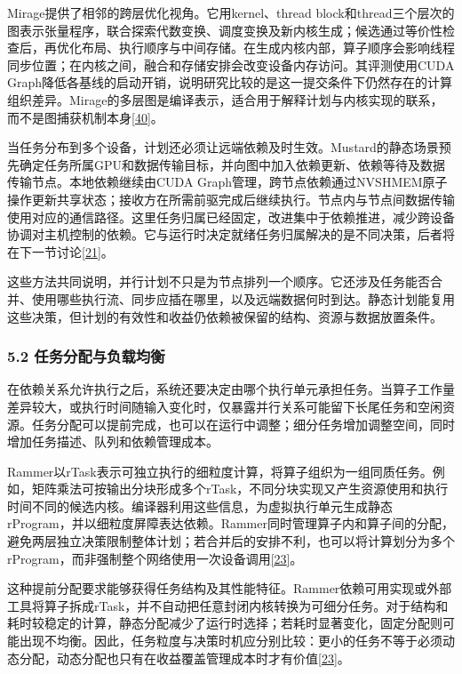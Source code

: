 \documentclass[UTF8,11pt,fontset=windows]{ctexart}
\begin{document}
Mirage提供了相邻的跨层优化视角。它用kernel、thread block和thread三个层次的图表示张量程序，联合探索代数变换、调度变换及新内核生成；候选通过等价性检查后，再优化布局、执行顺序与中间存储。在生成内核内部，算子顺序会影响线程同步位置；在内核之间，融合和存储安排会改变设备内存访问。其评测使用CUDA Graph降低各基线的启动开销，说明研究比较的是这一提交条件下仍然存在的计算组织差异。Mirage的多层图是编译表示，适合用于解释计划与内核实现的联系，而不是图捕获机制本身\protect\hyperlink{ref-40}{{[}40{]}}。

当任务分布到多个设备，计划还必须让远端依赖及时生效。Mustard的静态场景预先确定任务所属GPU和数据传输目标，并向图中加入依赖更新、依赖等待及数据传输节点。本地依赖继续由CUDA Graph管理，跨节点依赖通过NVSHMEM原子操作更新共享状态；接收方在所需前驱完成后继续执行。节点内与节点间数据传输使用对应的通信路径。这里任务归属已经固定，改进集中于依赖推进，减少跨设备协调对主机控制的依赖。它与运行时决定就绪任务归属解决的是不同决策，后者将在下一节讨论\protect\hyperlink{ref-21}{{[}21{]}}。

这些方法共同说明，并行计划不只是为节点排列一个顺序。它还涉及任务能否合并、使用哪些执行流、同步应插在哪里，以及远端数据何时到达。静态计划能复用这些决策，但计划的有效性和收益仍依赖被保留的结构、资源与数据放置条件。

\hypertarget{section-5-2}{%
\subsubsection{5.2 任务分配与负载均衡}\label{section-5-2}}

在依赖关系允许执行之后，系统还要决定由哪个执行单元承担任务。当算子工作量差异较大，或执行时间随输入变化时，仅暴露并行关系可能留下长尾任务和空闲资源。任务分配可以提前完成，也可以在运行中调整；细分任务增加调整空间，同时增加任务描述、队列和依赖管理成本。

Rammer以rTask表示可独立执行的细粒度计算，将算子组织为一组同质任务。例如，矩阵乘法可按输出分块形成多个rTask，不同分块实现又产生资源使用和执行时间不同的候选内核。编译器利用这些信息，为虚拟执行单元生成静态rProgram，并以细粒度屏障表达依赖。Rammer同时管理算子内和算子间的分配，避免两层独立决策限制整体计划；若合并后的安排不利，也可以将计算划分为多个rProgram，而非强制整个网络使用一次设备调用\protect\hyperlink{ref-23}{{[}23{]}}。

这种提前分配要求能够获得任务结构及其性能特征。Rammer依赖可用实现或外部工具将算子拆成rTask，并不自动把任意封闭内核转换为可细分任务。对于结构和耗时较稳定的计算，静态分配减少了运行时选择；若耗时显著变化，固定分配则可能出现不均衡。因此，任务粒度与决策时机应分别比较：更小的任务不等于必须动态分配，动态分配也只有在收益覆盖管理成本时才有价值\protect\hyperlink{ref-23}{{[}23{]}}。
\end{document}
